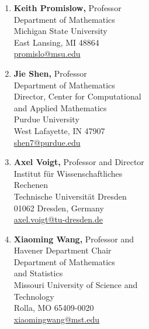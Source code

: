 \documentclass[11pt]{letter}
\begin{document}
\begin{multicols}{2}
\begin{enumerate}
	\columnbreak
	
	\item
\textbf{Keith Promislow,} Professor
	\\
Department of Mathematics
	\\
Michigan State University
	\\
East Lansing, MI 48864
	\\
\url{promislo@msu.edu}
	
	\item
\textbf{Jie Shen,} Professor
	\\
Department of Mathematics
	\\
Director, Center for Computational  
	\\
\hspace*{0.25in} and Applied Mathematics
	\\
Purdue University
	\\
West Lafayette, IN 47907
	\\
\url{shen7@purdue.edu}

 	\item
\textbf{Axel Voigt,} Professor and Director
	\\
Institut f\"{u}r Wissenschaftliches 
	\\
\hspace*{0.25in} Rechenen
	\\
Technische Universit\"{a}t Dresden
	\\
01062 Dresden, Germany
	\\
\url{axel.voigt@tu-dresden.de}
	
	\item
\textbf{Xiaoming Wang,} Professor and  
	\\
\hspace*{0.25in} Havener Department Chair
	\\
Department of Mathematics 
	\\
\hspace*{0.25in}and Statistics
	\\
Missouri University of Science and
	\\
\hspace*{0.25in} Technology
	\\
Rolla, MO 65409-0020
	\\
\url{xiaomingwang@mst.edu}

	\end{enumerate}
	
	\end{multicols}
	
    
\end{document}
